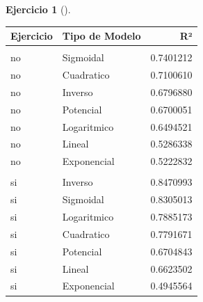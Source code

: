 \documentclass[
  a4paper,
]{scrreport}
\newenvironment{Shaded}{\begin{snugshade}}{\end{snugshade}}
\newcommand{\AttributeTok}[1]{\textcolor[rgb]{0.40,0.45,0.13}{#1}}
\newcommand{\FunctionTok}[1]{\textcolor[rgb]{0.28,0.35,0.67}{#1}}
\newcommand{\NormalTok}[1]{\textcolor[rgb]{0.00,0.23,0.31}{#1}}
\newcommand{\SpecialCharTok}[1]{\textcolor[rgb]{0.37,0.37,0.37}{#1}}
\newcommand{\StringTok}[1]{\textcolor[rgb]{0.13,0.47,0.30}{#1}}
\theoremstyle{definition}
\newtheorem{exercise}{Ejercicio}[chapter]
\theoremstyle{remark}
\begin{document}
\begin{exercise}[]
\begin{enumerate}
\begin{tcolorbox}
\begin{Shaded}
\end{Shaded}

  \begin{longtable*}[t]{llr}
  \toprule
  Ejercicio & Tipo de Modelo & R²\\
  \midrule
  \addlinespace[0.3em]
  \\
  \hspace{1em}no & Sigmoidal & 0.7401212\\
  \hspace{1em}no & Cuadratico & 0.7100610\\
  \hspace{1em}no & Inverso & 0.6796880\\
  \hspace{1em}no & Potencial & 0.6700051\\
  \hspace{1em}no & Logaritmico & 0.6494521\\
  \hspace{1em}no & Lineal & 0.5286338\\
  \hspace{1em}no & Exponencial & 0.5222832\\
  \addlinespace[0.3em]
  \\
  \hspace{1em}si & Inverso & 0.8470993\\
  \hspace{1em}si & Sigmoidal & 0.8305013\\
  \hspace{1em}si & Logaritmico & 0.7885173\\
  \hspace{1em}si & Cuadratico & 0.7791671\\
  \hspace{1em}si & Potencial & 0.6704843\\
  \hspace{1em}si & Lineal & 0.6623502\\
  \hspace{1em}si & Exponencial & 0.4945564\\
  \bottomrule
  \end{longtable*}


\end{tcolorbox}
\end{enumerate}
\end{exercise}
\end{document}
